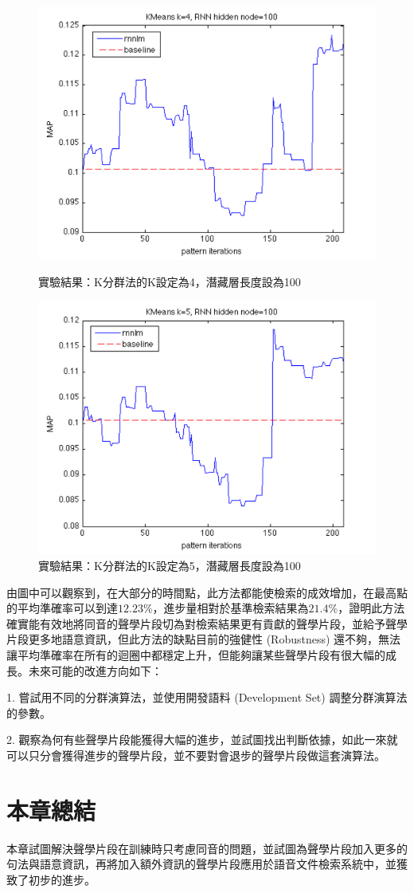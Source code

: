 \begin{figure}
\centering
\includegraphics[scale=0.5]{images/chap5_result1.png}
\caption{實驗結果：K分群法的K設定為4，潛藏層長度設為100} \label{fig:chap5_result1}
\includegraphics[scale=0.5]{images/chap5_result2.png}
\caption{實驗結果：K分群法的K設定為5，潛藏層長度設為100} \label{fig:chap5_result2}
\end{figure}

由圖中可以觀察到，在大部分的時間點，此方法都能使檢索的成效增加，在最高點的平均準確率可以到達$12.23\%$，進步量相對於基準檢索結果為$21.4\%$，證明此方法確實能有效地將同音的聲學片段切為對檢索結果更有貢獻的聲學片段，並給予聲學片段更多地語意資訊，但此方法的缺點目前的強健性 (Robustness) 還不夠，無法讓平均準確率在所有的迴圈中都穩定上升，但能夠讓某些聲學片段有很大幅的成長。未來可能的改進方向如下：

1. 嘗試用不同的分群演算法，並使用開發語料 (Development Set) 調整分群演算法的參數。

2. 觀察為何有些聲學片段能獲得大幅的進步，並試圖找出判斷依據，如此一來就可以只分會獲得進步的聲學片段，並不要對會退步的聲學片段做這套演算法。

\section{本章總結}
本章試圖解決聲學片段在訓練時只考慮同音的問題，並試圖為聲學片段加入更多的句法與語意資訊，再將加入額外資訊的聲學片段應用於語音文件檢索系統中，並獲致了初步的進步。
